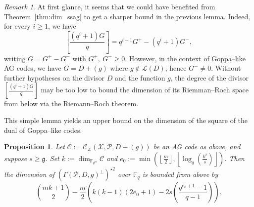 \documentclass[journal]{IEEEtran}
\theoremstyle{plain}
\newtheorem{proposition}[thm]{Proposition}
\theoremstyle{definition}
\theoremstyle{remark}
\newtheorem{remark}[thm]{Remark}
\newcommand{\calP}{\mathcal{P}}
\newcommand{\calL}{\mathcal{L}}
\newcommand{\calC}{\mathcal{C}}
\newcommand{\calX}{\mathcal{X}}
\newcommand{\fqm}{\mathbb{F}_{q^m}}
\newcommand{\fq}{\mathbb{F}_{q}}
\begin{document}
	\begin{remark}\label{rmk:improvements}
		At first glance, it seems that we could have benefited from Theorem~\ref{thm:dim_ssag} to get a sharper bound in the previous lemma. Indeed, for every $i \geq 1$, we have 
		\[\left[\frac{(q^i+1)G}{q}\right]=q^{i-1}G^+ - (q^i+1)G^-,\]
		writing $G=G^+-G^-$ with $G^+, \: G^- \geq 0$. However, in the context of Goppa--like AG codes, we have $G=D+(g)$ where $g \notin \calL(D)$, hence $G^- \neq 0$. Without further hypotheses on the divisor $D$ and the function $g$, the degree of the divisor $\left[\frac{(q^i+1)G}{q}\right]$ may be too low to bound the dimension of its Riemman--Roch space from below via the Riemann--Roch theorem.
	\end{remark}
	
	This simple lemma yields an upper bound on the dimension of the square of the dual of Goppa--like codes.
	\begin{proposition} \label{prop:bound_dim_using_inclusions}
		Let $\calC := \calC_{\calL}(\calX,\calP,D+(g))$ be an AG code as above, and suppose $s \geq \mathfrak{g}$. Set $k := \dim_{\fqm}\calC$ and  $e_0 := \min\left(\left\lfloor \frac{m}{2} \right\rfloor,\left\lfloor \log_q\left(\frac{k^2}{s}\right)\right\rfloor\right)$. Then the dimension of $(\Gamma(\calP,D,g)^{\perp})^{\star 2}$ over $\fq$ is bounded from above by
\[
 \binom{mk+1}{2} - \dfrac{m}{2}\left(k(k-1)(2e_0+1)-2s\left(\dfrac{q^{e_0+1}-1}{q-1}\right)\right).
\]		
	\end{proposition}
	
\end{document}
